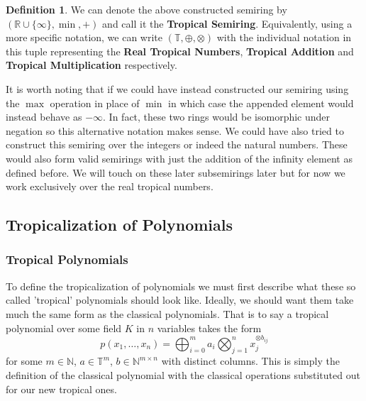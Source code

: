 \documentclass[12pt,a4paper]{amsart}
\newcommand{\N}{\mathbb{N}}
\newcommand{\R}{\mathbb{R}}
\newcommand{\T}{\mathbb{T}}
\newcommand{\K}{K}
\theoremstyle{definition}
\newtheorem{defn}{Definition}[section]
\theoremstyle{remark}
\begin{document}
\begin{defn}
We can denote the above constructed semiring by $(\R\cup\{\infty\},\min,+)$ and call it the \textbf{Tropical Semiring}. Equivalently, using a more specific notation, we can write $(\T,\oplus,\otimes)$ with the individual notation in this tuple representing the \textbf{Real Tropical Numbers}, \textbf{Tropical Addition} and \textbf{Tropical Multiplication} respectively.
\end{defn}

It is worth noting that if we could have instead constructed our semiring using the $\max$ operation in place of $\min$ in which case the appended element would instead behave as $-\infty$. In fact, these two rings would be isomorphic under negation so this alternative notation makes sense. We could have also tried to construct this semiring over the integers or indeed the natural numbers. These would also form valid semirings with just the addition of the infinity element as defined before. We will touch on these later subsemirings later but for now we work exclusively over the real tropical numbers.

\subsection{Tropicalization of Polynomials}

\subsubsection{Tropical Polynomials}

To define the tropicalization of polynomials we must first describe what these so called 'tropical' polynomials should look like. Ideally, we should want them take much the same form as the classical polynomials. That is to say a tropical polynomial over some field $\K$ in $n$ variables takes the form
\begin{equation}
    p(x_1,\dots,x_n) = \bigoplus_{i=0}^m a_i\bigotimes_{j=1}^n x_j^{\otimes b_{ij}}
\end{equation}
for some $m\in\N$, $a\in\T^m$, $b\in \N^{m\times n}$ with distinct columns. This is simply the definition of the classical polynomial with the classical operations substituted out for our new tropical ones.
\end{document}
